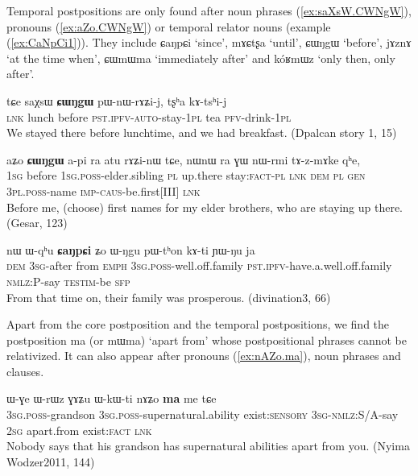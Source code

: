 \documentclass[oldfontcommands,oneside,a4paper,11pt]{article}
\newcommand{\ipa}[1]{{\phon \mbox{#1}}} %
\newcommand{\refb}[1]{(\ref{#1})}
\begin{document}
Temporal postpositions   are only found after noun phrases \refb{ex:saXsW.CWNgW}, pronouns \refb{ex:aZo.CWNgW} or temporal relator nouns (example \refb{ex:CaNpCi1}). They include  \ipa{ɕaŋpɕi} `since', \ipa{mɤɕtʂa} `until', \ipa{ɕɯŋgɯ} `before', \ipa{jɤznɤ} `at the time when',  \ipa{ɕɯmɯma} `immediately after' and \ipa{kóʁmɯz}   `only then, only after'.

\begin{exe}
   \ex \label{ex:saXsW.CWNgW}
 \gll 
\ipa{tɕe}  	\ipa{saχsɯ}  	\ipa{\textbf{ɕɯŋgɯ}}  	\ipa{pɯ-nɯ-rɤʑi-j,}  	\ipa{tʂʰa}  	\ipa{kɤ-tsʰi-j}  \\
\textsc{lnk} lunch before \textsc{pst.ipfv-auto}-stay-\textsc{1pl} tea \textsc{pfv}-drink-\textsc{1pl} \\
\glt  We stayed there before lunchtime, and we had breakfast. 
(Dpalcan story 1, 15)
\end{exe}

\begin{exe}
   \ex \label{ex:aZo.CWNgW}
 \gll 
\ipa{aʑo}  	\ipa{\textbf{ɕɯŋgɯ}}  	\ipa{a-pi}  	\ipa{ra}  	\ipa{atu}  	\ipa{rɤʑi-nɯ}  	\ipa{tɕe,}  	\ipa{nɯnɯ}  	\ipa{ra}  	\ipa{ɣɯ}  	\ipa{nɯ-rmi}  	\ipa{tɤ-z-mɤke}  	\ipa{qʰe,}   \\
\textsc{1sg} before \textsc{1sg.poss}-elder.sibling \textsc{pl} up.there stay:\textsc{fact}-\textsc{pl} \textsc{lnk} \textsc{dem} \textsc{pl} \textsc{gen} \textsc{3pl.poss}-name \textsc{imp-caus}-be.first[III] \textsc{lnk} \\
\glt Before me, (choose) first names for my elder brothers, who are staying up there. (Gesar, 123)
 \end{exe}
\begin{exe}
\ex \label{ex:CaNpCi1} 
\gll  
\ipa{nɯ}   	\ipa{ɯ-qʰu}   	\textbf{\ipa{ɕaŋpɕi}}   	\ipa{ʑo}   	\ipa{ɯ-ŋgu}   	\ipa{pɯ-tʰon}   	\ipa{kɤ-ti}   	\ipa{ɲɯ-ŋu}   	\ipa{ja}   \\
\textsc{dem} \textsc{3sg}-after from  \textsc{emph} \textsc{3sg.poss}-well.off.family  \textsc{pst.ipfv}-have.a.well.off.family \textsc{nmlz:P}-say \textsc{testim}-be \textsc{sfp} \\
\glt  From that time on, their family was prosperous.   (divination3, 66)
\end{exe}

Apart from the core postposition and the temporal postpositions, we find the   postposition \ipa{ma} (or \ipa{mɯma}) `apart from'   whose postpositional phrases cannot be relativized. It can also appear after pronouns \refb{ex:nAZo.ma}, noun phrases and clauses.
 \begin{exe}
\ex \label{ex:nAZo.ma} 
\gll  
 \ipa{ɯ-ɣe}  	\ipa{ɯ-rɯz}  	\ipa{ɣɤʑu}  	\ipa{ɯ-kɯ-ti}  	 	\ipa{nɤʑo}  	\ipa{\textbf{ma}}  	\ipa{me}  	\ipa{tɕe}  \\
  \textsc{3sg.poss}-grandson   \textsc{3sg.poss}-supernatural.ability exist:\textsc{sensory} \textsc{3sg-nmlz:S/A}-say \textsc{2sg} apart.from exist:\textsc{fact} \textsc{lnk} \\
\glt Nobody says that his grandson has supernatural abilities apart from you. (Nyima Wodzer2011, 144)
\end{exe}
\end{document}

